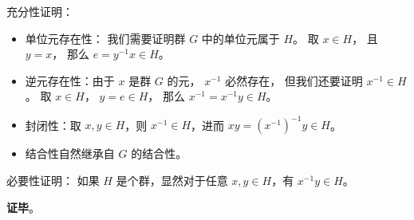 充分性证明：
\begin{itemize}
\item 单位元存在性： 我们需要证明群 $G$ 中的单位元属于 $H$。 取 $x\in H$， 且 $y = x$， 那么 $e = y^{-1}x \in H$。

\item 逆元存在性：由于 $x$ 是群 $G$ 的元， $x^{-1}$ 必然存在， 但我们还要证明 $x^{-1} \in H$。 取 $x \in H$， $y = e \in H$， 那么 $x^{-1} = x^{-1}y \in H$。

\item 封闭性：取 $x, y\in H$，则 $x^{-1}\in H$，进而 $xy=(x^{-1})^{-1}y\in H$。

\item 结合性自然继承自 $G$ 的结合性。
\end{itemize}

必要性证明： 如果 $H$ 是个群，显然对于任意 $x, y\in H$，有 $x^{-1}y\in H$。

\textbf{证毕}。
